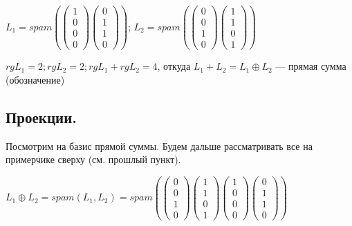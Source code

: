 \documentclass{article}
\begin{document}
$L_1 =spam ( \begin{pmatrix}

    1 \\
    0 \\
    0 \\
    0 
\end{pmatrix}  \begin{pmatrix}
    0 \\
    1 \\
    1 \\
    0 
\end{pmatrix} )$;
$L_2 =spam ( \begin{pmatrix}
    0 \\
    0 \\
    1 \\
    0 
\end{pmatrix}  \begin{pmatrix}
    1 \\
    1 \\
    0 \\
    1 
\end{pmatrix} )$

$rg L_1 = 2; rg L_2 = 2; rg L_1 + rg L_2 = 4$, откуда $L_1 + L_2 = L_1 \oplus L_2 $ --- прямая сумма (обозначение)
\subsection{Проекции.}

Посмотрим на базис прямой суммы. Будем дальше рассматривать все на примерчике сверху (см. прошлый пункт).

$L_1 \oplus L_2  = spam (L_1,L_2) = spam (\begin{pmatrix}
    0 \\
    0 \\
    1 \\
    0 
\end{pmatrix}  \begin{pmatrix}
    1 \\
    1 \\
    0 \\
    1 
\end{pmatrix}\begin{pmatrix}
    1 \\
    0 \\
    0 \\
    0 
\end{pmatrix}  \begin{pmatrix}
    0 \\
    1 \\
    1 \\
    0 
\end{pmatrix})$ 
\end{document}
